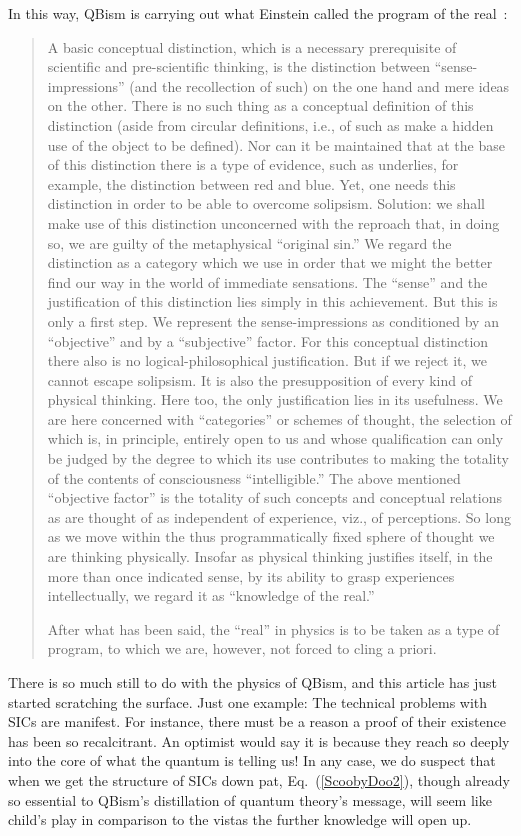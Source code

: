 \documentclass[aps,pra,superscriptaddress,12pt,tightenlines,nofootinbib]{revtex4-2}
\begin{document}
In this way, QBism is carrying out what Einstein called the program of the real~\cite{Einstein49b}:
\begin{quote}
\noindent  A basic conceptual distinction, which is a necessary
prerequisite of scientific and pre-scientific thinking, is the
distinction between ``sense-impressions'' (and the recollection of
such) on the one hand and mere ideas on the other.  There is no such
thing as a conceptual definition of this distinction (aside from
circular definitions, i.e., of such as make a hidden use of the object
to be defined). Nor can it be maintained that at the base of this
distinction there is a type of evidence, such as underlies, for
example, the distinction between red and blue. Yet, one needs this
distinction in order to be able to overcome solipsism. Solution: we
shall make use of this distinction unconcerned with the reproach that,
in doing so, we are guilty of the metaphysical ``original sin.'' We
regard the distinction as a category which we use in order that we
might the better find our way in the world of immediate
sensations. The ``sense'' and the justification of this distinction
lies simply in this achievement. But this is only a first step. We
represent the sense-impressions as conditioned by an ``objective'' and
by a ``subjective'' factor. For this conceptual distinction there also
is no logical-philosophical justification. But if we reject it, we
cannot escape solipsism. It is also the presupposition of every kind
of physical thinking. Here too, the only justification lies in its
usefulness. We are here concerned with ``categories'' or schemes of
thought, the selection of which is, in principle, entirely open to us
and whose qualification can only be judged by the degree to which its
use contributes to making the totality of the contents of
consciousness ``intelligible.'' The above mentioned ``objective
factor'' is the totality of such concepts and conceptual relations as
are thought of as independent of experience, viz., of perceptions. So
long as we move within the thus programmatically fixed sphere of
thought we are thinking physically. Insofar as physical thinking
justifies itself, in the more than once indicated sense, by its
ability to grasp experiences intellectually, we regard it as
``knowledge of the real.''

After what has been said, the ``real'' in physics is to be taken as a type of program,
to which we are, however, not forced to cling a priori.
\end{quote}

There is so much still to do with the physics of QBism, and this article has just started scratching the surface.  Just one example:  The technical problems with SICs are manifest.  For instance, there must be a reason a proof of their existence has been so recalcitrant.  An optimist would say it is because they reach so deeply into the core of what the quantum is telling us!  In any case, we do suspect that when we get the structure of SICs down pat, Eq.~(\ref{ScoobyDoo2}), though already so essential to QBism's distillation of quantum theory's message, will seem like child's play in comparison to the vistas the further knowledge will open up.
\end{document}
